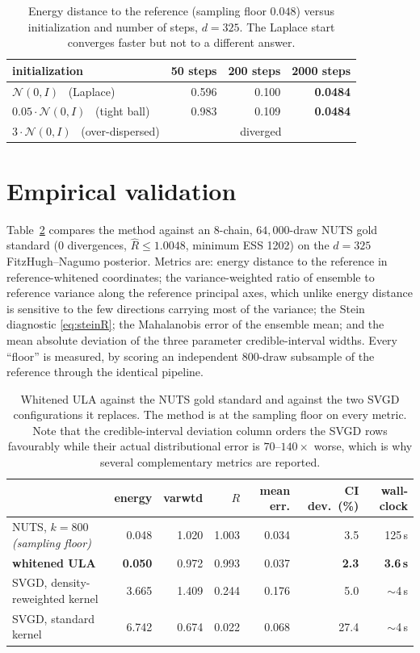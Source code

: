 \documentclass[11pt]{article}
\begin{document}
\begin{table}[t]
\centering
\begin{tabular}{lrrr}
\toprule
initialization & 50 steps & 200 steps & 2000 steps \\
\midrule
$\mathcal{N}(0,I)$ \ (Laplace) & 0.596 & 0.100 & \textbf{0.0484} \\
$0.05\cdot\mathcal{N}(0,I)$ \ (tight ball) & 0.983 & 0.109 & \textbf{0.0484} \\
$3\cdot\mathcal{N}(0,I)$ \ (over-dispersed) & \multicolumn{3}{c}{diverged} \\
\bottomrule
\end{tabular}
\caption{Energy distance to the reference (sampling floor $0.048$) versus initialization and
number of steps, $d=325$. The Laplace start converges faster but not to a different answer.}
\label{tab:init}
\end{table}

\section{Empirical validation}

Table~\ref{tab:main} compares the method against an 8-chain, $64{,}000$-draw NUTS gold standard
(0 divergences, $\hat R \le 1.0048$, minimum ESS 1202) on the $d=325$ FitzHugh--Nagumo posterior.
Metrics are: energy distance to the reference in reference-whitened coordinates; the
variance-weighted ratio of ensemble to reference variance along the reference principal axes,
which unlike energy distance is sensitive to the few directions carrying most of the variance;
the Stein diagnostic \eqref{eq:steinR}; the Mahalanobis error of the ensemble mean; and the mean
absolute deviation of the three parameter credible-interval widths. Every ``floor'' is measured,
by scoring an independent $800$-draw subsample of the reference through the identical pipeline.

\begin{table}[t]
\centering
\small
\begin{tabular}{lrrrrrr}
\toprule
& energy & varwtd & $R$ & mean err. & CI dev.\ (\%) & wall-clock \\
\midrule
NUTS, $k=800$ \emph{(sampling floor)} & 0.048 & 1.020 & 1.003 & 0.034 & 3.5 & 125\,s \\
\textbf{whitened ULA} & \textbf{0.050} & 0.972 & 0.993 & 0.037 & \textbf{2.3} & \textbf{3.6\,s} \\
SVGD, density-reweighted kernel & 3.665 & 1.409 & 0.244 & 0.176 & 5.0 & $\sim$4\,s \\
SVGD, standard kernel & 6.742 & 0.674 & 0.022 & 0.068 & 27.4 & $\sim$4\,s \\
\bottomrule
\end{tabular}
\normalsize
\caption{Whitened ULA against the NUTS gold standard and against the two SVGD configurations it
replaces. The method is at the sampling floor on every metric. Note that the credible-interval
deviation column orders the SVGD rows favourably while their actual distributional error is
$70$--$140\times$ worse, which is why several complementary metrics are reported.}
\label{tab:main}
\end{table}
\end{document}
